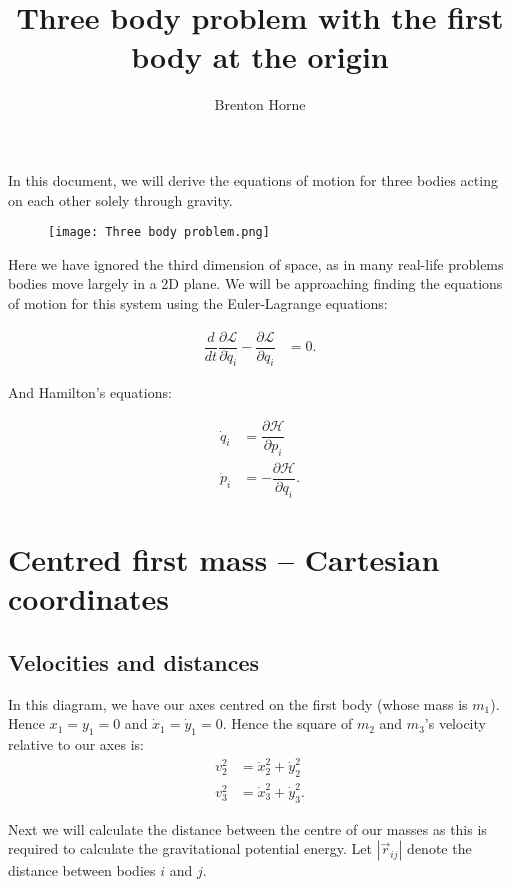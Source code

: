 \documentclass[12pt,a4paper,portrait]{article}
\date{}
\title{Three body problem with the first body at the origin}
\author{Brenton Horne}
\begin{document}
	\maketitle
	
	In this document, we will derive the equations of motion for three bodies acting on each other solely through gravity. 
	\begin{figure}[H]
		\texttt{[image: Three body problem.png]}
	\end{figure}
	
	Here we have ignored the third dimension of space, as in many real-life problems bodies move largely in a 2D plane. We will be approaching finding the equations of motion for this system using the Euler-Lagrange equations:
	
	\begin{align}
		\dfrac{d}{dt}\dfrac{\partial \mathcal{L}}{\partial \dot{q}_i} - \dfrac{\partial \mathcal{L}}{\partial q_i} &= 0.\label{ELE}
	\end{align}
	
	And Hamilton's equations:
	
	\begin{align}
		\dot{q}_i &= \dfrac{\partial \mathcal{H}}{\partial p_i} \\
		\dot{p}_i &= -\dfrac{\partial \mathcal{H}}{\partial q_i}.
	\end{align}
	
	\tableofcontents
	
	\section{Centred first mass -- Cartesian coordinates}
	\subsection{Velocities and distances}
	In this diagram, we have our axes centred on the first body (whose mass is $m_1$). Hence $x_1=y_1 = 0$ and $\dot{x}_1 = \dot{y}_1 = 0$. Hence the square of $m_2$ and $m_3$'s velocity relative to our axes is: 
	\begin{align*}
		v_2^2 &= \dot{x}_2^2 + \dot{y}_2^2 \\
		v_3^2 &= \dot{x}_3^2 + \dot{y}_3^2.
	\end{align*}
	
	Next we will calculate the distance between the centre of our masses as this is required to calculate the gravitational potential energy. Let $|\vec{r}_{ij}|$ denote the distance between bodies $i$ and $j$. 
	
\end{document}
